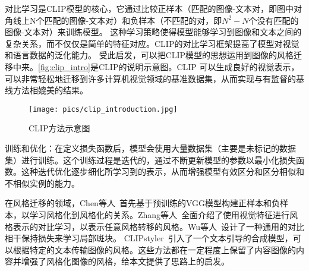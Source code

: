对比学习是CLIP模型的核心，它通过比较正样本（匹配的图像-文本对，即图中对角线上N个匹配的图像-文本对）和负样本（不匹配的对，即$N^2-N$个没有匹配的图像-文本对）来训练模型。
这种学习策略使得模型能够学习到图像和文本之间的复杂关系，而不仅仅是简单的特征对应。CLIP的对比学习框架提高了模型对视觉和语言数据的泛化能力。
受此启发，可以把CLIP模型的思想运用到图像的风格迁移中来。\autoref{fig:clip_intro}是CLIP的说明示意图。CLIP 可以生成良好的视觉表示，
可以非常轻松地迁移到许多计算机视觉领域的基准数据集，从而实现与有监督的基线方法相媲美的结果。
\begin{figure}[htbp]
    \centering
    \texttt{[image: pics/clip\_introduction.jpg]}
    \caption{\label{fig:clip_intro}CLIP方法示意图~\cite{radford2021learning}}
\end{figure}
\par 训练和优化：在定义损失函数后，模型会使用大量数据集（主要是未标记的数据集）进行训练。这个训练过程是迭代的，通过不断更新模型的参数以最小化损失函数。这种迭代优化逐步细化所学习到的表示，从而增强模型有效区分和区分相似和不相似实例的能力。
\par 在风格迁移的领域，Chen等人~\cite{chen2021artistic}首先基于预训练的VGG模型构建正样本和负样本，以学习风格化到风格化的关系。Zhang等人~\cite{zhang2022domain}全面介绍了使用视觉特征进行风格表示的对比学习，以表示任意风格转移的风格。Wu等人~\cite{wu2022ccpl}设计了一种通用的对比相干保持损失来学习局部斑块。
CLIPstyler~\cite{kwon2022clipstyler}引入了一个文本引导的合成模型，可以根据特定的文本传输图像的风格。这些方法都在一定程度上保留了内容图像的内容并增强了风格化图像的风格，给本文提供了思路上的启发。


